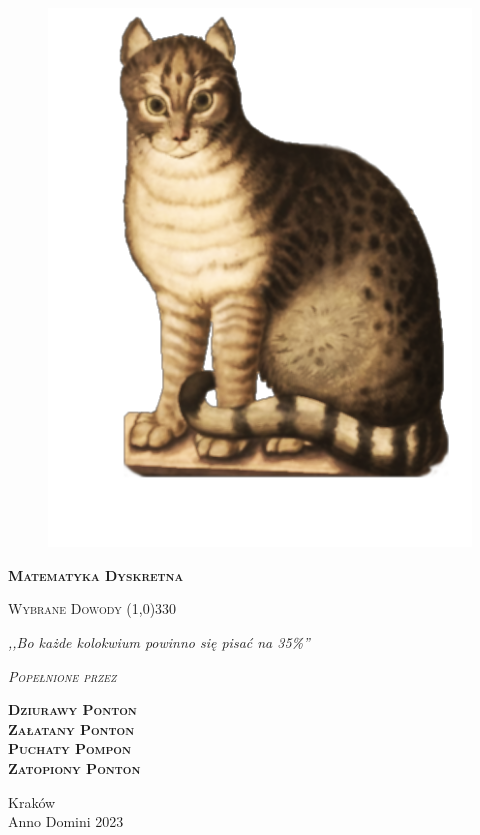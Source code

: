 \begin{titlepage} 
    \begin{center}
         \begin{figure}[h]
            \centering
            \includegraphics[scale=0.8]{img/kitku6.png}
        \end{figure}
        
        \Huge
        \textbf{\textsc{Matematyka Dyskretna}}
        
        \vspace{0.5cm}
        \Large
        \textsc{Wybrane Dowody}
        \line(1,0){330}
        
        \normalsize
        
        \vspace{1cm}
        \textit{,,Bo każde kolokwium powinno się pisać na 35\%''}
        \vspace{1cm}

        \textit{\textsc{Popełnione przez}}\\
        \vspace{5mm}
  
        \textbf{\textsc{Dziurawy Ponton \\ Załatany Ponton \\ Puchaty Pompon \\ Zatopiony Ponton}}
 
        \vfill

        Kraków \\
        Anno Domini 2023
    \end{center}
\end{titlepage}